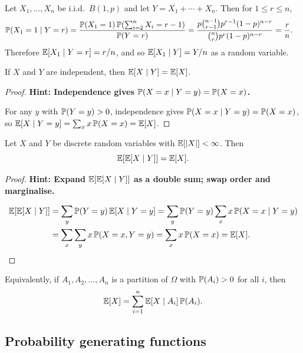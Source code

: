 \documentclass[a4paper]{article}
\begin{document}
\begin{eg}
  Let $X_1, \dotsc, X_n$ be i.i.d.\ $B(1, p)$ and let $Y = X_1 + \cdots + X_n$. Then for $1 \leq r \leq n$,
  \begin{align*}
    \P(X_1 = 1\mid Y = r) &= \frac{\P(X_1 = 1)\,\P(\sum_{i=2}^n X_i = r - 1)}{\P(Y = r)} = \frac{p\binom{n - 1}{r - 1}p^{r - 1}(1 - p)^{n - r}}{\binom{n}{r} p^r (1 - p)^{n - r}} = \frac{r}{n}.
  \end{align*}
  Therefore $\E[X_1\mid Y = r] = r/n$, and so $\E[X_1\mid Y] = Y/n$ as a random variable.
\end{eg}

\begin{prop}
  If $X$ and $Y$ are independent, then $\E[X\mid Y] = \E[X]$.
\end{prop}

\begin{proof}
  \textbf{Hint: Independence gives $\P(X = x \mid Y = y) = \P(X = x)$.}

  For any $y$ with $\P(Y = y) > 0$, independence gives $\P(X = x \mid Y = y) = \P(X = x)$, so $\E[X\mid Y = y] = \sum_x x\,\P(X = x) = \E[X]$.
\end{proof}

\begin{thm}
  Let $X$ and $Y$ be discrete random variables with $\E[|X|] < \infty$. Then
  \[
    \E[\E[X\mid Y]] = \E[X].
  \]
\end{thm}

\begin{proof}
  \textbf{Hint: Expand $\E[\E[X \mid Y]]$ as a double sum; swap order and marginalise.}

  \begin{align*}
    \E[\E[X\mid Y]] &= \sum_y \P(Y = y)\,\E[X\mid Y = y] = \sum_y \P(Y = y) \sum_{x}x\,\P(X = x\mid Y = y)\\
    &= \sum_x\sum_y x\,\P(X = x, Y = y) = \sum_x x\,\P(X = x) = \E[X].\qedhere
  \end{align*}
\end{proof}

\begin{remark}
  Equivalently, if $A_1, A_2, \dotsc, A_n$ is a partition of $\Omega$ with $\P(A_i) > 0$ for all $i$, then
  \[
    \E[X] = \sum_{i=1}^{n}\E[X\mid A_i]\,\P(A_i).
  \]
\end{remark}

\subsection{Probability generating functions}
\end{document}
